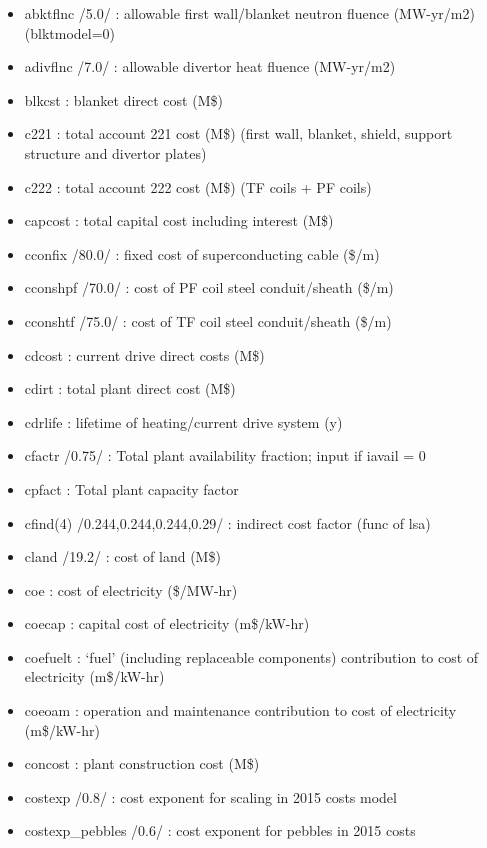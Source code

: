 \documentclass[]{article}
\providecommand{\tightlist}{%
  \setlength{\itemsep}{0pt}\setlength{\parskip}{0pt}}
\begin{document}
\begin{itemize}
  \begin{itemize}
  \tightlist
  \item
    abktflnc /5.0/ : allowable first wall/blanket neutron fluence
    (MW-yr/m2) (blktmodel=0)
  \item
    adivflnc /7.0/ : allowable divertor heat fluence (MW-yr/m2)
  \item
    blkcst : blanket direct cost (M\$)
  \item
    c221 : total account 221 cost (M\$) (first wall, blanket, shield,
    support structure and divertor plates)
  \item
    c222 : total account 222 cost (M\$) (TF coils + PF coils)
  \item
    capcost : total capital cost including interest (M\$)
  \item
    cconfix /80.0/ : fixed cost of superconducting cable (\$/m)
  \item
    cconshpf /70.0/ : cost of PF coil steel conduit/sheath (\$/m)
  \item
    cconshtf /75.0/ : cost of TF coil steel conduit/sheath (\$/m)
  \item
    cdcost : current drive direct costs (M\$)
  \item
    cdirt : total plant direct cost (M\$)
  \item
    cdrlife : lifetime of heating/current drive system (y)
  \item
    cfactr /0.75/ : Total plant availability fraction; input if iavail =
    0
  \item
    cpfact : Total plant capacity factor
  \item
    cfind(4) /0.244,0.244,0.244,0.29/ : indirect cost factor (func of
    lsa)
  \item
    cland /19.2/ : cost of land (M\$)
  \item
    coe : cost of electricity (\$/MW-hr)
  \item
    coecap : capital cost of electricity (m\$/kW-hr)
  \item
    coefuelt : `fuel' (including replaceable components) contribution to
    cost of electricity (m\$/kW-hr)
  \item
    coeoam : operation and maintenance contribution to cost of
    electricity (m\$/kW-hr)
  \item
    concost : plant construction cost (M\$)
  \item
    costexp /0.8/ : cost exponent for scaling in 2015 costs model
  \item
    costexp\_pebbles /0.6/ : cost exponent for pebbles in 2015 costs

\end{itemize}
\end{itemize}
\end{document}
